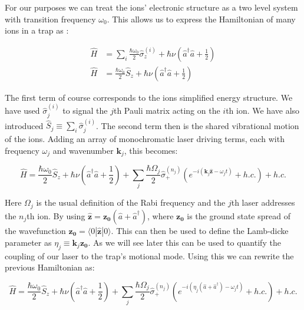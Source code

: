 \documentclass[12pt,twoside]{report}
\begin{document}
For our purposes we can treat the ions' electronic structure as a two level system with transition frequency $\omega_0$. This allows us to express the Hamiltonian of many ions in a trap as \cite{RF_Traps}:

\begin{align}
	\hat{H} &= \sum_{i} \frac{\hbar \omega_0}{2}\hat{\sigma}_z^{\left(i\right)} + \hbar\nu\left(\hat{a}^\dagger\hat{a} + \frac{1}{2}\right)
	\label{eq:RF_Trap_H}\\
	\hat{H} &= \frac{\hbar \omega_0}{2}\hat{S}_z + \hbar\nu\left(\hat{a}^\dagger\hat{a} + \frac{1}{2}\right)
	\label{eq:RF_Trap_H_S}
\end{align}

The first term of course corresponds to the ions simplified energy structure. We have used $\hat{\sigma}_j^{\left(i\right)}$ to signal the $j$th Pauli matrix acting on the $i$th ion. We have also introduced $\hat{S}_j \equiv \sum_{i} \hat{\sigma}_j^{\left(i\right)}$. The second term then is the shared vibrational motion of the ions. Adding an array of monochromatic laser driving terms, each with frequency $\omega_j$ and wavenumber $\mathbf{k}_j$, this becomes:

\begin{equation}
	\hat{H} = \frac{\hbar \omega_0}{2}\hat{S}_z + \hbar\nu\left(\hat{a}^\dagger\hat{a} + \frac{1}{2}\right) + \sum_{j}\frac{\hbar\Omega_j}{2}\hat{\sigma}^{\left(n_j\right)}_+\left(e^{-i\left(\mathbf{k}_j\mathbf{\hat{z}} - \omega_jt\right)} + h.c.\right) + h.c.
	\label{eq:RF_Trap_H_driven}
\end{equation}

Here $\Omega_j$ is the usual definition of the Rabi frequency \cite{Foot} and the $j$th laser addresses the $n_j$th ion. By using $\mathbf{\hat{z}} = \mathbf{z_0}\left(\hat{a} + \hat{a}^\dagger\right)$, where $\mathbf{z_0}$ is the ground state spread of the wavefunction $\mathbf{z_0} = \langle0|\mathbf{\hat{z}}|0\rangle$. This can then be used to define the Lamb-dicke parameter\cite{Sideband_cooling_penning_trap} as $\eta_j\equiv\mathbf{k}_j\mathbf{z_0}$. As we will see later this can be used to quantify the coupling of our laser to the trap's motional mode. Using this we can rewrite the previous Hamiltonian as:

\begin{equation}
	\hat{H} = \frac{\hbar \omega_0}{2}\hat{S}_z + \hbar\nu\left(\hat{a}^\dagger\hat{a} + \frac{1}{2}\right) + \sum_{j}\frac{\hbar\Omega_j}{2}\hat{\sigma}^{\left(n_j\right)}_+\left(e^{-i\left(\eta_j\left(\hat{a} + \hat{a}^\dagger\right) - \omega_jt\right)} + h.c.\right) + h.c.
	\label{eq:RF_Trap_H_driven_LD_param}
\end{equation}
\end{document}
